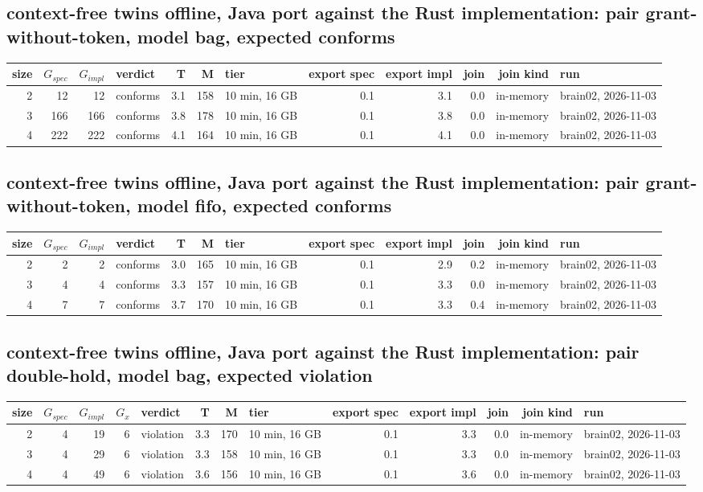 \documentclass[10pt]{article}
\begin{document}
\subsection*{context-free twins offline, Java port against the Rust implementation: pair \textsf{grant-without-token}, model bag, expected conforms}
\begin{longtable}{@{}rrrlrrlrrrrl@{}}
\toprule
size & $G_{\mathit{spec}}$ & $G_{\mathit{impl}}$ & verdict & T & M & tier & export spec & export impl & join & join kind & run \\
\midrule
\endhead
\color{red} 2 & 12 & 12 & conforms & 3.1 & 158 & 10 min, 16 GB & 0.1 & 3.1 & 0.0 & in-memory & brain02, 2026-11-03 \\
\color{red} 3 & 166 & 166 & conforms & 3.8 & 178 & 10 min, 16 GB & 0.1 & 3.8 & 0.0 & in-memory & brain02, 2026-11-03 \\
\color{red} 4 & 222 & 222 & conforms & 4.1 & 164 & 10 min, 16 GB & 0.1 & 4.1 & 0.0 & in-memory & brain02, 2026-11-03 \\
\bottomrule
\end{longtable}
\subsection*{context-free twins offline, Java port against the Rust implementation: pair \textsf{grant-without-token}, model fifo, expected conforms}
\begin{longtable}{@{}rrrlrrlrrrrl@{}}
\toprule
size & $G_{\mathit{spec}}$ & $G_{\mathit{impl}}$ & verdict & T & M & tier & export spec & export impl & join & join kind & run \\
\midrule
\endhead
\color{red} 2 & 2 & 2 & conforms & 3.0 & 165 & 10 min, 16 GB & 0.1 & 2.9 & 0.2 & in-memory & brain02, 2026-11-03 \\
\color{red} 3 & 4 & 4 & conforms & 3.3 & 157 & 10 min, 16 GB & 0.1 & 3.3 & 0.0 & in-memory & brain02, 2026-11-03 \\
\color{red} 4 & 7 & 7 & conforms & 3.7 & 170 & 10 min, 16 GB & 0.1 & 3.3 & 0.4 & in-memory & brain02, 2026-11-03 \\
\bottomrule
\end{longtable}
\subsection*{context-free twins offline, Java port against the Rust implementation: pair \textsf{double-hold}, model bag, expected violation}
\begin{longtable}{@{}rrrrlrrlrrrrl@{}}
\toprule
size & $G_{\mathit{spec}}$ & $G_{\mathit{impl}}$ & $G_x$ & verdict & T & M & tier & export spec & export impl & join & join kind & run \\
\midrule
\endhead
\color{red} 2 & 4 & 19 & 6 & violation & 3.3 & 170 & 10 min, 16 GB & 0.1 & 3.3 & 0.0 & in-memory & brain02, 2026-11-03 \\
\color{red} 3 & 4 & 29 & 6 & violation & 3.3 & 158 & 10 min, 16 GB & 0.1 & 3.3 & 0.0 & in-memory & brain02, 2026-11-03 \\
\color{red} 4 & 4 & 49 & 6 & violation & 3.6 & 156 & 10 min, 16 GB & 0.1 & 3.6 & 0.0 & in-memory & brain02, 2026-11-03 \\
\bottomrule
\end{longtable}
\end{document}
